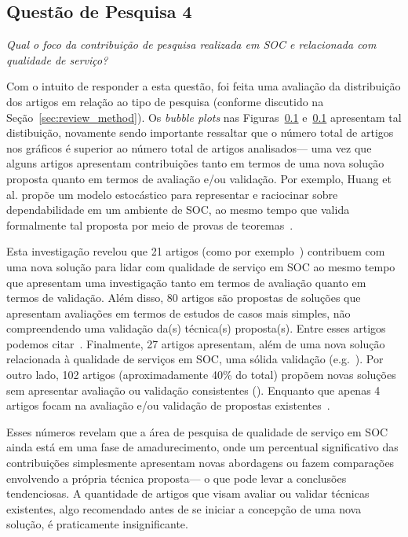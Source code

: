 \subsection{Questão de Pesquisa 4}

\emph{Qual o foco da contribuição de pesquisa realizada em SOC e relacionada com qualidade de serviço? }

Com o intuito de responder a esta questão, foi feita uma avalia\c c\~{a}o da distribui\c c\~{a}o dos 
artigos em rela\c c\~{a}o ao tipo de pesquisa (conforme discutido na Se\c c\~{a}o~\ref{sec:review_method}). 
Os \emph{bubble plots} nas Figuras~\ref{} e~\ref{}  apresentam tal distibui\c c\~{a}o, novamente sendo importante 
ressaltar que o n\'{u}mero total de artigos nos gr\'{a}ficos \'{e} superior ao n\'{u}mero total de artigos analisados--- 
uma vez que alguns artigos apresentam contribui\c c\~{o}es tanto em termos de uma nova solu\c c\~{a}o proposta 
quanto em termos de avalia\c c\~{a}o e/ou valida\c c\~{a}o. Por exemplo, Huang et al. prop\~{o}e um 
modelo estoc\'{a}stico para representar e raciocinar sobre dependabilidade em um ambiente de SOC, ao mesmo tempo 
que valida formalmente tal proposta por meio de provas de teoremas~\cite{huang:scc2011}.

Esta investiga\c c\~{a}o revelou que 21 artigos (como por exemplo~\cite{jeong:fqs2009,ardagna:jss2010}) 
contribuem com uma nova solu\c c\~{a}o para 
lidar com qualidade de servi\c co em SOC ao mesmo tempo que apresentam uma investiga\c c\~{a}o tanto 
em termos de avalia\c c\~{a}o quanto em termos de valida\c c\~{a}o. Al\'{e}m disso, 80 
artigos s\~{a}o propostas de solu\c c\~{o}es que apresentam 
avalia\c c\~{o}es em termos de estudos de casos mais simples, n\~{a}o compreendendo uma 
valida\c c\~{a}o da(s) t\'{e}cnica(s) proposta(s). Entre esses artigos podemos 
citar~\cite{filieri:faa2012, pernici:services2011,nascimento:splc2011}. Finalmente, 27 artigos apresentam, 
al\'{e}m de uma nova solu\c c\~{a}o relacionada \`{a} qualidade de servi\c cos em SOC, 
uma s\'{o}lida valida\c c\~{a}o (e.g.~\cite{huang:scc2011,binshtok:icsoc2009}).    
Por outro lado, 102 artigos (aproximadamente 40\% do total) prop\~{o}em novas 
solu\c c\~{o}es sem apresentar avalia\c c\~{a}o ou valida\c c\~{a}o consistentes (\cite{balfagih:icime2011,fiadeiro:fac2011,khazankin:scc2011}). 
Enquanto que apenas 4 artigos focam na avalia\c c\~{a}o e/ou valida\c c\~{a}o de 
propostas existentes~\cite{voelz:edoc2010,moayed:icsea2010,cavallo:pesos2010,banerjee:isorcw2011}.  

Esses n\'{u}meros revelam que a \'{a}rea de pesquisa de qualidade de servi\c co em 
SOC ainda est\'{a} em uma fase 
de amadurecimento, onde um percentual significativo das contribui\c c\~{o}es 
simplesmente apresentam novas abordagens ou fazem compara\c c\~{o}es envolvendo a 
pr\'{o}pria t\'{e}cnica proposta--- o que pode levar a conclus\~{o}es tendenciosas. A quantidade 
de artigos que visam avaliar ou validar t\'{e}cnicas existentes, algo recomendado antes 
de se iniciar a concep\c c\~{a}o de uma nova solu\c c\~{a}o, \'{e} praticamente insignificante. 
 
